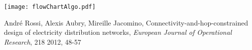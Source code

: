 \documentclass[12pt,a4paper]{article}
\begin{document}
\begingroup
    \centering
    \texttt{[image: flowChartAlgo.pdf]}
    \label{fig:algo}
\endgroup
\begin{multicols}{2}


\begin{thebibliography}{20}
André Rossi, Alexis Aubry, Mireille Jacomino, Connectivity-and-hop-constrained design of electricity distribution networks,  \textit{European Journal of Operational Research}, 218 2012, 48-57
\end{thebibliography}
\end{multicols}
\end{document}
